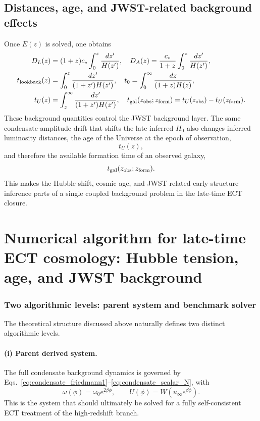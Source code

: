 \documentclass[11pt,a4paper]{article}
\numberwithin{equation}{section}
\begin{document}
\subsection{Distances, age, and JWST-related background effects}

Once $E(z)$ is solved, one obtains
\begin{align}
D_L(z)&=(1+z)c_*\int_0^z \frac{dz'}{H(z')},
\quad
D_A(z)=\frac{c_*}{1+z}\int_0^z \frac{dz'}{H(z')},
\label{eq:app_late_dist}\\
t_{\rm lookback}(z)&=\int_0^z \frac{dz'}{(1+z')H(z')},
\quad
t_0=\int_0^\infty \frac{dz}{(1+z)H(z)},
\label{eq:app_late_time}\\
t_U(z)&=\int_z^\infty \frac{dz'}{(1+z')H(z')},
\quad
t_{\rm gal}(z_{\rm obs};z_{\rm form})
=
t_U(z_{\rm obs})-t_U(z_{\rm form}).
\label{eq:app_late_agegal}
\end{align}
These background quantities control the JWST background layer.
The same condensate-amplitude drift that shifts the late inferred
$H_0$ also changes inferred luminosity distances, the age of the
Universe at the epoch of observation,
\[
t_U(z),
\]
and therefore the available formation time of an observed galaxy,
\[
t_{\rm gal}(z_{\rm obs};z_{\rm form}).
\]
This makes the Hubble shift, cosmic age, and JWST-related early-structure
inference parts of a single coupled background problem in the late-time
ECT closure.

\section{Numerical algorithm for late-time ECT cosmology: Hubble tension, age, and JWST background}
\label{app:late_cosmo_algorithm}

\subsubsection*{Two algorithmic levels: parent system and benchmark solver}

The theoretical structure discussed above naturally defines two distinct
algorithmic levels.

\paragraph{(i) Parent derived system.}
The full condensate background dynamics is governed by
Eqs.~\eqref{eq:condensate_friedmann1}--\eqref{eq:condensate_scalar_N},
with
\[
\omega(\phi)=\omega_0 e^{2\beta\phi},
\qquad
U(\phi)=W(u_\infty e^{\beta\phi}).
\]
This is the system that should ultimately be solved for a fully
self-consistent ECT treatment of the high-redshift branch.
\end{document}
